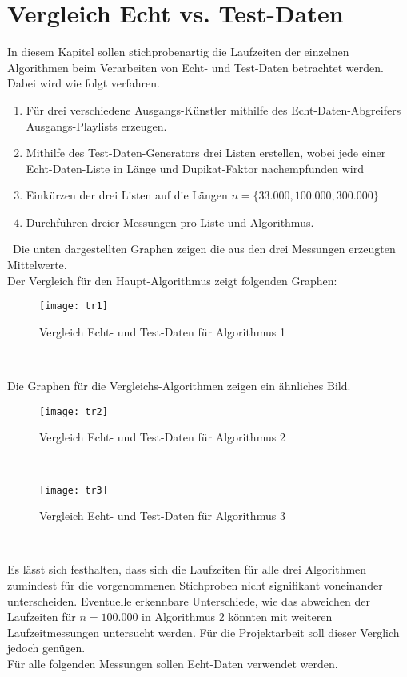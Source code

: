 \documentclass[
10pt, %
a4paper, %
oneside, %
headinclude,footinclude, %
BCOR5mm, %
]{scrartcl}
\begin{document}
\section{Vergleich Echt vs. Test-Daten}
In diesem Kapitel sollen stichprobenartig die Laufzeiten der einzelnen Algorithmen beim Verarbeiten von Echt- und Test-Daten betrachtet werden. Dabei wird wie folgt verfahren.
\begin{enumerate}[noitemsep]
	\item Für drei verschiedene Ausgangs-Künstler mithilfe des Echt-Daten-Abgreifers Ausgangs-Playlists erzeugen.
	\item Mithilfe des Test-Daten-Generators drei Listen erstellen, wobei jede einer Echt-Daten-Liste in Länge und Dupikat-Faktor nachempfunden wird
	\item Einkürzen der drei Listen auf die Längen \(n=\{33.000,100.000,300.000\} \)
	\item Durchführen dreier Messungen pro Liste und Algorithmus.
\end{enumerate}\
Die unten dargestellten Graphen zeigen die aus den drei Messungen erzeugten Mittelwerte.\\
Der Vergleich für den Haupt-Algorithmus zeigt folgenden Graphen:
\begin{figure}[h!]
	\centering 
	\texttt{[image: tr1]} 
	\caption[Vergleich Echt- und Test-Daten für Alg.1]{Vergleich Echt- und Test-Daten für Algorithmus 1}
\end{figure}\

Die Graphen für die Vergleichs-Algorithmen zeigen ein ähnliches Bild.
\begin{figure}[h!]
	\centering 
	\texttt{[image: tr2]} 
	\caption[Vergleich Echt- und Test-Daten für Alg.2]{Vergleich Echt- und Test-Daten für Algorithmus 2}
\end{figure}\
\begin{figure}[h!]
	\centering 
	\texttt{[image: tr3]} 
	\caption[Vergleich Echt- und Test-Daten für Alg.3]{Vergleich Echt- und Test-Daten für Algorithmus 3}
\end{figure}\

Es lässt sich festhalten, dass sich die Laufzeiten für alle drei Algorithmen zumindest für die vorgenommenen Stichproben nicht signifikant voneinander unterscheiden. Eventuelle erkennbare Unterschiede, wie das abweichen der Laufzeiten für \(n=100.000\) in Algorithmus 2 könnten mit weiteren Laufzeitmessungen untersucht werden. Für die Projektarbeit soll dieser Verglich jedoch genügen.\\ 
Für alle folgenden Messungen sollen Echt-Daten verwendet werden.
\pagebreak
\end{document}
